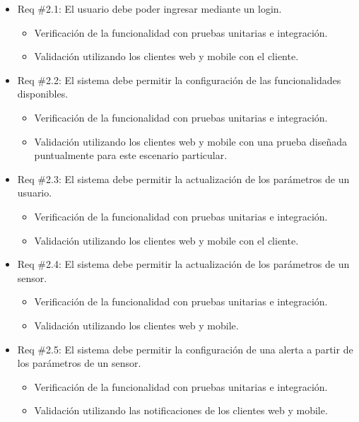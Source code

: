 \documentclass[
11pt, %
]{charter}
\begin{document}
\begin{itemize}
\item Req \#2.1: El usuario debe poder ingresar mediante un login.
\begin{itemize}
	\item  Verificación de la funcionalidad con pruebas unitarias e integración.
	\item Validación utilizando los clientes web y mobile con el cliente.
\end{itemize}

\item Req \#2.2: El sistema debe permitir la configuración de las funcionalidades disponibles.
\begin{itemize}
	\item  Verificación de la funcionalidad con pruebas unitarias e integración.
	\item Validación utilizando los clientes web y mobile con una prueba diseñada puntualmente para este escenario particular.
\end{itemize}

\item Req \#2.3: El sistema debe permitir la actualización de los parámetros de un usuario.
\begin{itemize}
	\item  Verificación de la funcionalidad con pruebas unitarias e integración.
	\item Validación utilizando los clientes web y mobile con el cliente.
\end{itemize}

\item Req \#2.4: El sistema debe permitir la actualización de los parámetros de un sensor.
\begin{itemize}
	\item  Verificación de la funcionalidad con pruebas unitarias e integración.
	\item Validación utilizando los clientes web y mobile.
\end{itemize}

\item Req \#2.5: El sistema debe permitir la configuración de una alerta a partir de los parámetros de un sensor.
\begin{itemize}
	\item  Verificación de la funcionalidad con pruebas unitarias e integración.
	\item Validación utilizando las notificaciones de los clientes web y mobile.
\end{itemize}


\end{itemize}
\end{document}
